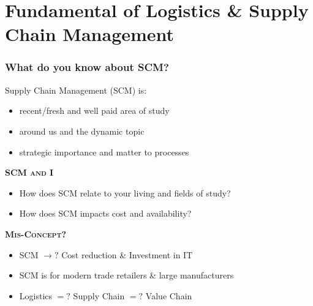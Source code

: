 \documentclass[10pt,handout]{beamer}
\begin{document}
\section[LSCM 101]{Fundamental of Logistics \& Supply Chain Management}
\begin{frame}
  \frametitle{What do you know about SCM?}

  Supply Chain Management (SCM) is:
  \begin{itemize}
      \item \alert{recent/fresh} and \alert{well paid} area of study
      \item \alert{around us} and the \alert{dynamic} topic
      \item \alert{strategic} importance and matter to \alert{processes}
  \end{itemize}

  \NextLine
  \textsc{\textbf{SCM and I}}
  \begin{itemize}
    \item How does SCM relate to your \alert{living} and \alert{fields of study}?
    \item How does SCM impacts \alert{cost} and \alert{availability}?
  \end{itemize}

  \NextLine
  \textsc{\textbf{Mis-Concept?}}
  \begin{itemize}
    \item SCM $\rightarrow\!\!\!\!\!?$ Cost reduction \& Investment in IT
    \item SCM is for modern trade \alert{retailers} \& large \alert{manufacturers}
    \item Logistics $=\!\!\!?$ Supply Chain $=\!\!\!?$ Value Chain
  \end{itemize}



\end{frame}
\end{document}
